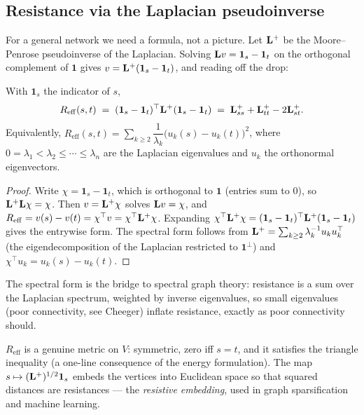 \subsection{Resistance via the Laplacian pseudoinverse}

For a general network we need a formula, not a picture. Let $\mathbf{L}^{+}$ be the Moore--Penrose pseudoinverse of the Laplacian. Solving $\mathbf{L} v=\mathbf{1}_s-\mathbf{1}_t$ on the orthogonal complement of $\mathbf{1}$ gives $v=\mathbf{L}^{+}(\mathbf{1}_s-\mathbf{1}_t)$, and reading off the drop:

\begin{theorem}\label{ch35:thm-reffform}
With $\mathbf{1}_s$ the indicator of $s$,
\[
  R_{\mathrm{eff}}(s,t)
  \;=\;(\mathbf{1}_s-\mathbf{1}_t)^\top \mathbf{L}^{+}(\mathbf{1}_s-\mathbf{1}_t)
  \;=\;\mathbf{L}^{+}_{ss}+\mathbf{L}^{+}_{tt}-2\mathbf{L}^{+}_{st}.
\]
Equivalently, $R_{\mathrm{eff}}(s,t)=\sum_{k\ge 2}\dfrac{1}{\lambda_k}\big(u_k(s)-u_k(t)\big)^2$, where $0=\lambda_1<\lambda_2\le\cdots\le\lambda_n$ are the Laplacian eigenvalues and $u_k$ the orthonormal eigenvectors.
\end{theorem}

\begin{proof}
Write $\chi=\mathbf{1}_s-\mathbf{1}_t$, which is orthogonal to $\mathbf{1}$ (entries sum to $0$), so $\mathbf{L}^+\mathbf{L}\chi=\chi$. Then $v=\mathbf{L}^+\chi$ solves $\mathbf{L} v=\chi$, and $R_{\mathrm{eff}}=v(s)-v(t)=\chi^\top v=\chi^\top\mathbf{L}^+\chi$. Expanding $\chi^\top\mathbf{L}^+\chi=(\mathbf{1}_s-\mathbf{1}_t)^\top\mathbf{L}^+(\mathbf{1}_s-\mathbf{1}_t)$ gives the entrywise form. The spectral form follows from $\mathbf{L}^+=\sum_{k\ge2}\lambda_k^{-1}u_ku_k^\top$ (the eigendecomposition of the Laplacian restricted to $\mathbf{1}^\perp$) and $\chi^\top u_k=u_k(s)-u_k(t)$.
\end{proof}

The spectral form is the bridge to spectral graph theory: resistance is a sum over the Laplacian spectrum, weighted by inverse eigenvalues, so small eigenvalues (poor connectivity, see Cheeger) inflate resistance, exactly as poor connectivity should.

\begin{remark}\label{ch35:rem-metric}
$R_{\mathrm{eff}}$ is a genuine metric on $V$: symmetric, zero iff $s=t$, and it satisfies the triangle inequality (a one-line consequence of the energy formulation). The map $s\mapsto (\mathbf{L}^+)^{1/2}\mathbf{1}_s$ embeds the vertices into Euclidean space so that squared distances are resistances --- the \emph{resistive embedding}, used in graph sparsification and machine learning.
\end{remark}

